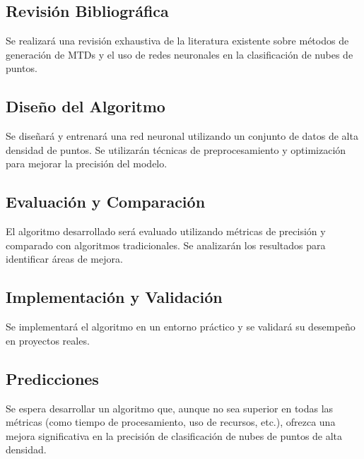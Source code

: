 \subsection{Revisión Bibliográfica}
Se realizará una revisión exhaustiva de la literatura existente sobre métodos de generación de MTDs y el uso de redes neuronales en la clasificación de nubes de puntos.

\subsection{Diseño del Algoritmo}
Se diseñará y entrenará una red neuronal utilizando un conjunto de datos de alta densidad de puntos. Se utilizarán técnicas de preprocesamiento y optimización para mejorar la precisión del modelo.

\subsection{Evaluación y Comparación}
El algoritmo desarrollado será evaluado utilizando métricas de precisión y comparado con algoritmos tradicionales. Se analizarán los resultados para identificar áreas de mejora.

\subsection{Implementación y Validación}
Se implementará el algoritmo en un entorno práctico y se validará su desempeño en proyectos reales.

\subsection{Predicciones}
Se espera desarrollar un algoritmo que, aunque no sea superior en todas las métricas (como tiempo de procesamiento, uso de recursos, etc.), ofrezca una mejora significativa en la precisión de clasificación de nubes de puntos de alta densidad.


